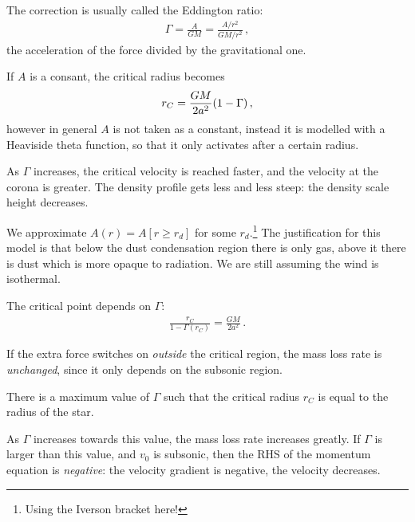 \documentclass[main.tex]{subfiles}
\begin{document}
The correction is usually called the Eddington ratio: 
%
\begin{align}
  \Gamma = \frac{A}{GM} = \frac{A/r^2}{GM / r^2}
\,,
\end{align}
%
the acceleration of the force divided by the gravitational one.


If \(A\) is a consant, the critical radius becomes 
%
\begin{align}
  r_C = \frac{GM}{2a^2} \qty(1 - \Gamma )
\,,
\end{align}
%
however in general \(A\) is not taken as a constant, instead it is modelled with a Heaviside theta function, so that it only activates after a certain radius.

As \(\Gamma \) increases, the critical velocity is reached faster, and the velocity at the corona is greater.
The density profile gets less and less steep: the density scale height decreases.

We approximate \(A(r) = A [r \geq r_d]\) for some \(r_d\).\footnote{Using the Iverson bracket here!}
The justification for this model is that below the dust condensation region there is only gas, above it there is dust which is more opaque to radiation.
We are still assuming the wind is isothermal.

The critical point depends on \(\Gamma \): 
%
\begin{align}
  \frac{r_C}{1 - \Gamma (r_C)} = \frac{GM}{2 a^2}
\,.
\end{align}
%

If the extra force switches on \emph{outside} the critical region, the mass loss rate is \emph{unchanged}, since it only depends on the subsonic region.


There is a maximum value of \(\Gamma\) such that the critical radius \(r_C\) is equal to the radius of the star. 

As \(\Gamma \) increases towards this value, the mass loss rate increases greatly. 
If \(\Gamma \) is larger than this value, and \(v_0 \) is subsonic, then the RHS of the momentum equation is \emph{negative}: the velocity gradient is negative, the velocity decreases. 
\end{document}
